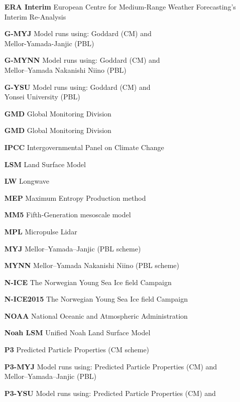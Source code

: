 \begin{enumerate}
    \item[\textbf{ERA Interim}] European Centre for Medium-Range Weather Forecasting’s Interim Re-Analysis
    \item[\textbf{G-MYJ}] Model runs using: Goddard (CM) and \\
    \hspace*{3.3cm} Mellor-Yamada-Janjic (PBL)
    \item[\textbf{G-MYNN}] Model runs using: Goddard (CM) and \\
    \hspace*{3.3cm} Mellor–Yamada Nakanishi Niino (PBL)
    \item[\textbf{G-YSU}] Model runs using: Goddard (CM) and \\
    \hspace*{3.3cm} Yonsei University (PBL)
    \item[\textbf{GMD}] Global Monitoring Division
    \item[\textbf{GMD}] Global Monitoring Division
    \item[\textbf{IPCC}] Intergovernmental Panel on Climate Change
    \item[\textbf{LSM}] Land Surface Model
    \item[\textbf{LW}] Longwave
    \item[\textbf{MEP}] Maximum Entropy Production method
    \item[\textbf{MM5}] Fifth-Generation mesoscale model
    \item[\textbf{MPL}] Micropulse Lidar
    \item[\textbf{MYJ}] Mellor–Yamada–Janjic (PBL scheme)
    \item[\textbf{MYNN}] Mellor–Yamada Nakanishi Niino (PBL scheme)
    \item[\textbf{N-ICE}] The Norwegian Young Sea Ice field Campaign
    \item[\textbf{N-ICE2015}] The Norwegian Young Sea Ice field Campaign
    \item[\textbf{NOAA}] National Oceanic and Atmospheric Administration
    \item[\textbf{Noah LSM}] Unified Noah Land Surface Model
    \item[\textbf{P3}] Predicted Particle Properties (CM scheme)
    \item[\textbf{P3-MYJ}] Model runs using: Predicted Particle Properties (CM) and \\
    \hspace*{3.3cm} Mellor–Yamada–Janjic (PBL)
    \item[\textbf{P3-YSU}] Model runs using: Predicted Particle Properties (CM) and \\

\end{enumerate}
